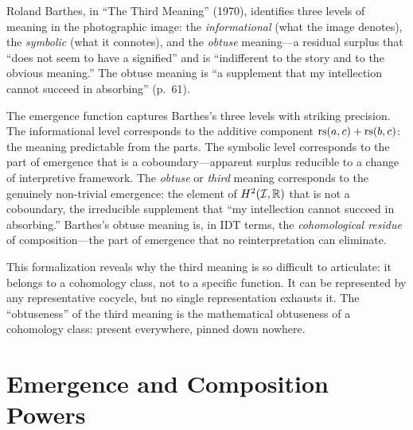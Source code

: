 \begin{interpretation}\label{interp:ch5:barthes_third_meaning}
Roland Barthes, in ``The Third Meaning'' (1970), identifies three levels of
meaning in the photographic image: the \emph{informational} (what the image
denotes), the \emph{symbolic} (what it connotes), and the \emph{obtuse}
meaning---a residual surplus that ``does not seem to have a
signified'' and is ``indifferent to the story and to the obvious meaning.''
The obtuse meaning is ``a supplement that my intellection cannot succeed in
absorbing'' (p.~61).

The emergence function captures Barthes's three levels with striking
precision. The informational level corresponds to the additive component
$\mathrm{rs}(a, c) + \mathrm{rs}(b, c)$: the meaning predictable from the parts. The
symbolic level corresponds to the part of emergence that is a
coboundary---apparent surplus reducible to a change of interpretive
framework. The \emph{obtuse} or \emph{third} meaning corresponds to the
genuinely non-trivial emergence: the element of $H^2(\mathcal{I}, \mathbb{R})$ that is
not a coboundary, the irreducible supplement that ``my intellection cannot
succeed in absorbing.'' Barthes's obtuse meaning is, in IDT terms, the
\emph{cohomological residue} of composition---the part of emergence that
no reinterpretation can eliminate.

This formalization reveals why the third meaning is so difficult to
articulate: it belongs to a cohomology class, not to a specific
function. It can be represented by any representative cocycle, but no
single representation exhausts it. The ``obtuseness'' of the third meaning
is the mathematical obtuseness of a cohomology class: present everywhere,
pinned down nowhere.
\end{interpretation}

\section{Emergence and Composition Powers}

